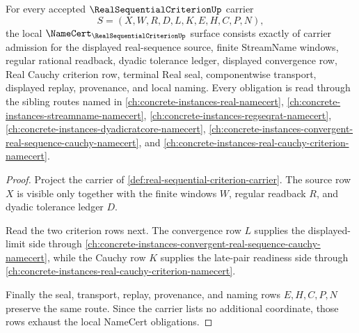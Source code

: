 \begin{theorem}
\label{thm:real-sequential-criterion-namecert-obligations}
For every accepted $\RealSequentialCriterionUp$ carrier
$$
S=(X,W,R,D,L,K,E,H,C,P,N),
$$
the local $\NameCert_{\RealSequentialCriterionUp}$ surface consists exactly of carrier admission for the displayed real-sequence source, finite StreamName windows, regular rational readback, dyadic tolerance ledger, displayed convergence row, Real Cauchy criterion row, terminal Real seal, componentwise transport, displayed replay, provenance, and local naming. Every obligation is read through the sibling routes named in \autoref{ch:concrete-instances-real-namecert}, \autoref{ch:concrete-instances-streamname-namecert}, \autoref{ch:concrete-instances-regseqrat-namecert}, \autoref{ch:concrete-instances-dyadicratcore-namecert}, \autoref{ch:concrete-instances-convergent-real-sequence-cauchy-namecert}, and \autoref{ch:concrete-instances-real-cauchy-criterion-namecert}.
\end{theorem}
\begin{proof}
Project the carrier of \autoref{def:real-sequential-criterion-carrier}. The source row $X$ is visible only together with the finite windows $W$, regular readback $R$, and dyadic tolerance ledger $D$.

Read the two criterion rows next. The convergence row $L$ supplies the displayed-limit side through \autoref{ch:concrete-instances-convergent-real-sequence-cauchy-namecert}, while the Cauchy row $K$ supplies the late-pair readiness side through \autoref{ch:concrete-instances-real-cauchy-criterion-namecert}.

Finally the seal, transport, replay, provenance, and naming rows $E,H,C,P,N$ preserve the same route. Since the carrier lists no additional coordinate, those rows exhaust the local NameCert obligations.
\end{proof}

